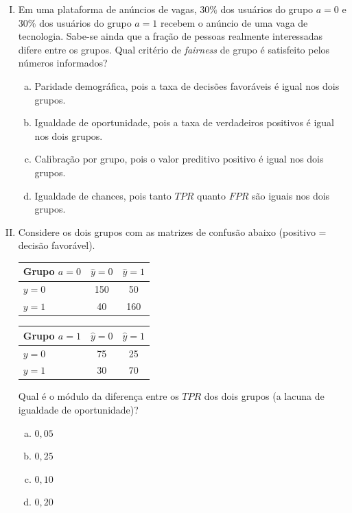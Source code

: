 \documentclass{dlproblemset}
\begin{document}
\begin{enumerate}[I)]
    \item Em uma plataforma de anúncios de vagas, $30\%$ dos usuários do grupo $a{=}0$ e $30\%$ dos usuários do grupo $a{=}1$ recebem o anúncio de uma vaga de tecnologia. Sabe-se ainda que a fração de pessoas realmente interessadas difere entre os grupos. Qual critério de \textit{fairness} de grupo é satisfeito pelos números informados?
    \begin{enumerate}[(a)]
        \item Paridade demográfica, pois a taxa de decisões favoráveis é igual nos dois grupos.
        \item Igualdade de oportunidade, pois a taxa de verdadeiros positivos é igual nos dois grupos.
        \item Calibração por grupo, pois o valor preditivo positivo é igual nos dois grupos.
        \item Igualdade de chances, pois tanto $TPR$ quanto $FPR$ são iguais nos dois grupos.
    \end{enumerate}

    \item Considere os dois grupos com as matrizes de confusão abaixo (positivo = decisão favorável).

    \begin{center}
    \begin{tabular}{lcc}
        \toprule
        \textbf{Grupo $a{=}0$} & \textbf{$\hat{y}{=}0$} & \textbf{$\hat{y}{=}1$} \\
        \midrule
        $y{=}0$ & 150 & 50 \\
        $y{=}1$ & 40  & 160 \\
        \bottomrule
    \end{tabular}
    \qquad
    \begin{tabular}{lcc}
        \toprule
        \textbf{Grupo $a{=}1$} & \textbf{$\hat{y}{=}0$} & \textbf{$\hat{y}{=}1$} \\
        \midrule
        $y{=}0$ & 75 & 25 \\
        $y{=}1$ & 30 & 70 \\
        \bottomrule
    \end{tabular}
    \end{center}

    Qual é o módulo da diferença entre os $TPR$ dos dois grupos (a lacuna de igualdade de oportunidade)?
    \begin{enumerate}[(a)]
        \item $0{,}05$
        \item $0{,}25$
        \item $0{,}10$
        \item $0{,}20$
    \end{enumerate}


\end{enumerate}
\end{document}
